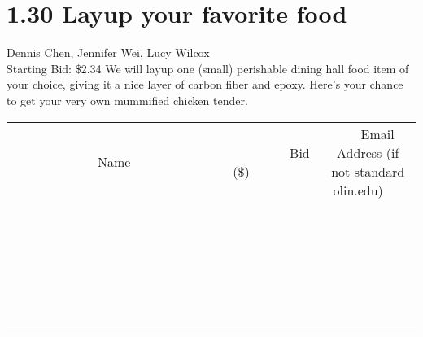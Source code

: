 \documentclass[11pt]{article}
\begin{document}
\section*{1.30 Layup your favorite food}
Dennis Chen, Jennifer Wei, Lucy Wilcox
\\
Starting Bid: \$2.34
\newline
We will layup one (small) perishable dining hall food item of your choice, giving it a nice layer of carbon fiber and epoxy. Here's your chance to get your very own mummified chicken tender.
\\[6ex]
\begin{tabular}{c c c}
~~~~~~~~~~~~~Name~~~~~~~~~~~~~ & ~~~~~~~~~Bid (\$)~~~~~~~~~  & ~~~Email Address (if not standard olin.edu)~~~\\
 & & \\
\hline
 & & \\
\hline
 & & \\
\hline
 & & \\
\hline
 & & \\
\hline
 & & \\
\hline
 & & \\
\hline
 & & \\
\hline
 & & \\
\hline
 & & \\
\hline
 & & \\
\hline
 & & \\
\hline
 & & \\
\hline
 & & \\
\hline
 & & \\
\hline
 & & \\
\hline
 & & \\
\hline
 & & \\
\hline
 & & \\
\hline
 & & \\
\hline
 & & \\
\hline
 & & \\
\hline
 & & \\
\hline
 & & \\
\hline
 & & \\
\hline
 & & \\
\hline
\end{tabular}
\newpage
\end{document}
